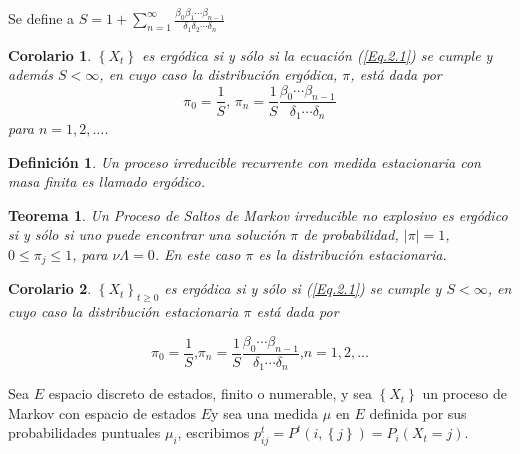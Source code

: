 \documentclass{article}
\newtheorem{Def}{Definición}[section]
\newtheorem{Teo}{Teorema}[section]
\newtheorem{Cor}{Corolario}[section]
\numberwithin{equation}{section}
\begin{document}
Se define a $S=1+\sum_{n=1}^{\infty}\frac{\beta_{0}\beta_{1}\cdots\beta_{n-1}}{\delta_{1}\delta_{2}\cdots\delta_{n}}$

\begin{Cor}\label{Cor.2.4}
$\left\{X_{t}\right\}$ es erg\'odica si y s\'olo si la ecuaci\'on (\ref{Eq.2.1}) se cumple y adem\'as $S<\infty$, en cuyo caso la distribuci\'on erg\'odica, $\pi$, est\'a dada por
\begin{equation}\label{Eq.2.4}
\pi_{0}=\frac{1}{S}\textrm{, }\pi_{n}=\frac{1}{S}\frac{\beta_{0}\cdots\beta_{n-1}}{\delta_{1}\cdots\delta_{n}}
\end{equation}
para $n=1,2,\ldots$.
\end{Cor}

\begin{Def}
Un proceso irreducible recurrente con medida estacionaria con masa finita es llamado erg\'odico.
\end{Def}

\begin{Teo}\label{Teo4.3}
Un Proceso de Saltos de Markov irreducible no explosivo es erg\'odico si y s\'olo si uno puede encontrar una soluci\'on $\pi$ de probabilidad, $|\pi|=1$, $0\leq\pi_{j}\leq1$, para $\nu\Lambda=0$. En este caso $\pi$ es la distribuci\'on estacionaria.
\end{Teo}
\begin{Cor}\label{Corolario2.4}
$\left\{X_{t}\right\}_{t\geq0}$ es erg\'odica si y s\'olo si (\ref{Eq.2.1}) se cumple y $S<\infty$, en cuyo caso la distribuci\'on estacionaria $\pi$ est\'a dada por

\begin{equation}\label{Eq.2.4}
\pi_{0}=\frac{1}{S}\textrm{,
}\pi_{n}=\frac{1}{S}\frac{\beta_{0}\cdots\beta_{n-1}}{\delta_{1}\cdots\delta_{n}}\textrm{,
}n=1,2,\ldots
\end{equation}
\end{Cor}


Sea $E$ espacio discreto de estados, finito o numerable, y sea $\left\{X_{t}\right\}$ un proceso de Markov con espacio de estados $E$y sea una medida $\mu$ en $E$ definida por sus probabilidades puntuales $\mu_{i}$, escribimos $p_{ij}^{t}=P^{t}\left(i,\left\{j\right\}\right)=P_{i}\left(X_{t}=j\right)$.\\
\end{document}
